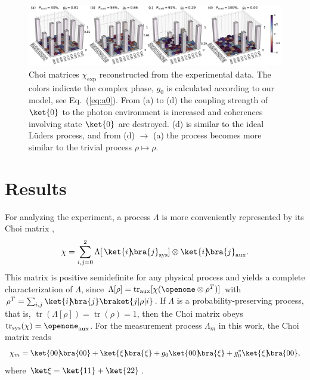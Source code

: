 \documentclass[12pt,
onecolumn,
superscriptaddress,
floatfix,
]{revtex4-2}
\DeclareMathOperator{\tr}{tr}
\newcommand{\ketbra}[2]{{\ket{#1}\!\!\bra{#2}}}
\newcommand{\proj}[1]{{\ketbra{#1}{#1}}}
\begin{document}
\begin{figure}[htp]
\includegraphics[width=\linewidth]{chi_phase_total.pdf}
\caption{\label{fig:chi}%
Choi matrices $\chi_\mathrm{exp}$ reconstructed from the experimental data. The colors indicate the complex phase,
$g_0$ is calculated according to our model, see Eq.~(\ref{eq:a0}).
From (a) to (d) the coupling strength of $\ket{0}$ to the photon environment is increased and coherences involving state $\ket{0}$ are destroyed.
(d) is similar to the ideal Lüders process, and from (d) $\rightarrow$ (a) the process becomes more similar to the trivial process $\rho \mapsto \rho$.}
\end{figure}


\section{Results}

For analyzing the experiment, a process $\Lambda$ is more conveniently 
 represented by its Choi matrix \cite{Heinosaari12},
%
\begin{equation}
 \chi= \sum_{i,j=0}^2 
\Lambda[\,\ketbra{i}j_\mathrm{sys}]\otimes\ketbra{i}j_\mathrm{aux}.
\end{equation}
%
This matrix is positive semidefinite for any physical process and yields a 
 complete characterization of $\Lambda$, since
 $\Lambda[\rho]= \tr_\mathrm{aux}[\chi(\openone\otimes\rho^T)]$ with
 $\rho^T= \sum_{i,j}\ketbra{i}j\braket{j|\rho|i}$.
If $\Lambda$ is a probability-preserving process, that is, $\tr(\Lambda[\rho])= 
 \tr(\rho)= 1$, then the Choi matrix obeys $\tr_\mathrm{sys}(\chi)= 
 \openone_\mathrm{aux}$.
For the measurement process $\Lambda_m$ in this work, the Choi matrix reads
%
\begin{equation}\label{eq:choimodel}
 \chi_m= \proj{00}+\proj{\xi}+
 g_0\ketbra{00}{\xi}+g_0^*\ketbra{\xi}{00},
\end{equation}
%
 where $\ket\xi= \ket{11}+\ket{22}$.
\end{document}
